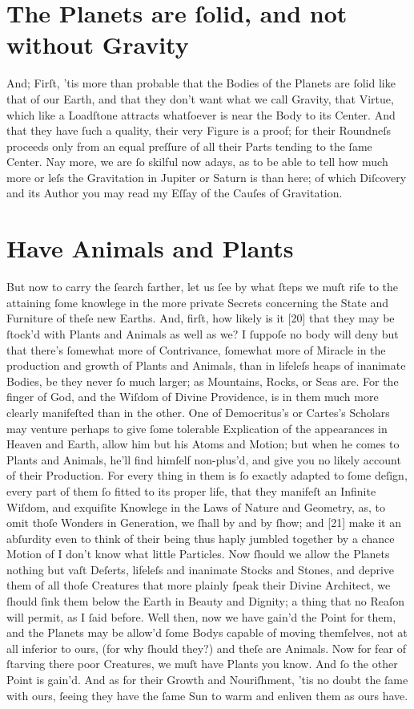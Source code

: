 \documentclass[letterpaper]{book}
\begin{document}
\section{The Planets are ſolid, and not without Gravity}

And; Firſt, 'tis more than probable that the Bodies of the Planets are ſolid
like that of our Earth, and that they don't want what we call Gravity, that
Virtue, which like a Loadſtone attracts whatſoever is near the Body to its
Center. And that they have ſuch a quality, their very Figure is a proof; for
their Roundneſs proceeds only from an equal preſſure of all their Parts
tending to the ſame Center. Nay more, we are ſo skilful now adays, as to be
able to tell how much more or leſs the Gravitation in Jupiter or Saturn is
than here; of which Diſcovery and its Author you may read my Eſſay of the
Cauſes of Gravitation.


\section{Have Animals and Plants}

But now to carry the ſearch farther, let us ſee by what ſteps we muſt riſe
to the attaining ſome knowlege in the more private Secrets concerning the
State and Furniture of theſe new Earths. And, firſt, how likely is it [20]
that they may be ſtock'd with Plants and Animals as well as we? I ſuppoſe no
body will deny but that there's ſomewhat more of Contrivance, ſomewhat
more of Miracle in the production and growth of Plants and Animals, than in
lifeleſs heaps of inanimate Bodies, be they never ſo much larger; as
Mountains, Rocks, or Seas are. For the finger of God, and the Wiſdom of
Divine Providence, is in them much more clearly manifeſted than in the
other. One of Democritus's or Cartes's Scholars may venture perhaps to give
ſome tolerable Explication of the appearances in Heaven and Earth, allow him
but his Atoms and Motion; but when he comes to Plants and Animals, he'll
find himſelf non-plus'd, and give you no likely account of their Production.
For every thing in them is ſo exactly adapted to ſome deſign, every part of
them ſo fitted to its proper life, that they manifeſt an Infinite Wiſdom,
and exquiſite Knowlege in the Laws of Nature and Geometry, as, to omit thoſe
Wonders in Generation, we ſhall by and by ſhow; and [21] make it an
abſurdity even to think of their being thus haply jumbled together by a
chance Motion of I don't know what little Particles. Now ſhould we allow the
Planets nothing but vaſt Deſerts, lifeleſs and inanimate Stocks and Stones,
and deprive them of all thoſe Creatures that more plainly ſpeak their Divine
Architect, we ſhould ſink them below the Earth in Beauty and Dignity; a
thing that no Reaſon will permit, as I ſaid before.  Well then, now we have
gain'd the Point for them, and the Planets may be allow'd ſome Bodys capable
of moving themſelves, not at all inferior to ours, (for why ſhould they?)
and theſe are Animals. Now for fear of ſtarving there poor Creatures, we
muſt have Plants you know. And ſo the other Point is gain'd. And as for
their Growth and Nouriſhment, 'tis no doubt the ſame with ours, ſeeing they
have the ſame Sun to warm and enliven them as ours have.
\end{document}
